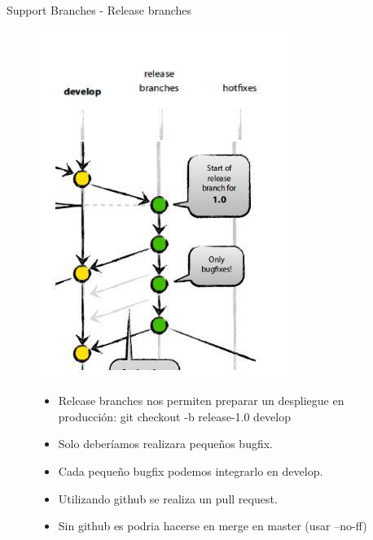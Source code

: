 \documentclass{beamer}
\begin{document}
\begin{frame}{Support Branches - Release branches}
\begin{figure}
	\begin{minipage}{0.3\textwidth}
		\includegraphics[scale=0.50,left]{rb.jpg}
	\end{minipage}
\begin{minipage}{0.6\textwidth}\raggedright
\begin{itemize}
  \item Release branches nos permiten preparar un despliegue en producción: git checkout -b release-1.0 develop
  \item Solo deberíamos realizara pequeños bugfix.
  \item Cada pequeño bugfix podemos integrarlo en develop.
  \item Utilizando github se realiza un pull request.
  \item Sin github es podria hacerse en merge en master (usar --no-ff)
\end{itemize}
\end{minipage}
\end{figure}
\end{frame}
\end{document}
